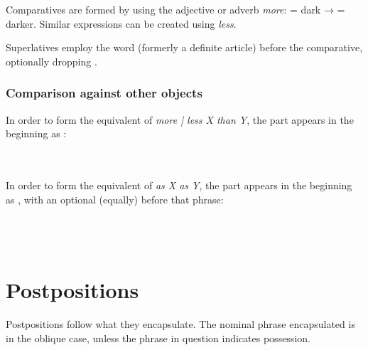 \documentclass{book}
\begin{document}
Comparatives are formed by using the adjective or adverb  \emph{more}:  = dark →  = darker. Similar expressions can be created using  \emph{less}.

Superlatives employ the word  (formerly a definite article) before the comparative, optionally dropping .

\subsection{Comparison against other objects}

In order to form the equivalent of \emph{more | less X than Y}, the  part appears in the beginning as :
~\\
    \\
    \\
  

In order to form the equivalent of \emph{as X as Y}, the  part appears in the beginning as , with an optional  (equally) before that phrase: \\
~\\
    \\
    \\
   


\chapter{Postpositions}

Postpositions follow what they encapsulate. The nominal phrase encapsulated is in the oblique case, unless the phrase in question indicates possession. \\
~\\
   \\
   \\
  
\end{document}
